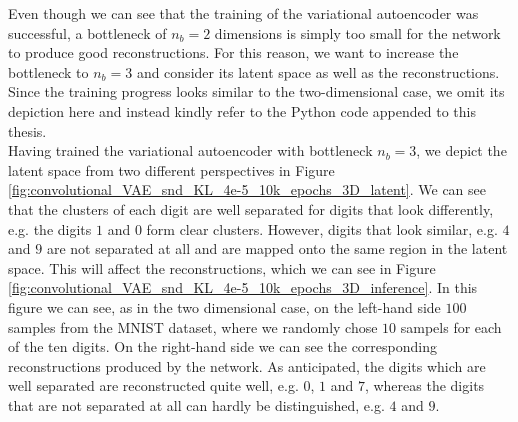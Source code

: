 Even though we can see that the training of the variational autoencoder was successful, a bottleneck of $n_b=2$ dimensions is simply too small for the network to produce good reconstructions. For this reason, we want to increase the bottleneck to $n_b=3$ and consider its latent space as well as the reconstructions. Since the training progress looks similar to the two-dimensional case, we omit its depiction here and instead kindly refer to the Python code appended to this thesis.\\
Having trained the variational autoencoder with bottleneck $n_b=3$, we depict the latent space from two different perspectives in Figure \ref{fig:convolutional_VAE_snd_KL_4e-5_10k_epochs_3D_latent}. We can see that the clusters of each digit are well separated for digits that look differently, e.g. the digits $1$ and $0$ form clear clusters. However, digits that look similar, e.g. $4$ and $9$ are not separated at all and are mapped onto the same region in the latent space. This will affect the reconstructions, which we can see in Figure \ref{fig:convolutional_VAE_snd_KL_4e-5_10k_epochs_3D_inference}. In this figure we can see, as in the two dimensional case, on the left-hand side $100$ samples from the MNIST dataset, where we randomly chose $10$ sampels for each of the ten digits. On the right-hand side we can see the corresponding reconstructions produced by the network. As anticipated, the digits which are well separated are reconstructed quite well, e.g. $0$, $1$ and $7$, whereas the digits that are not separated at all can hardly be distinguished, e.g. $4$ and $9$.


